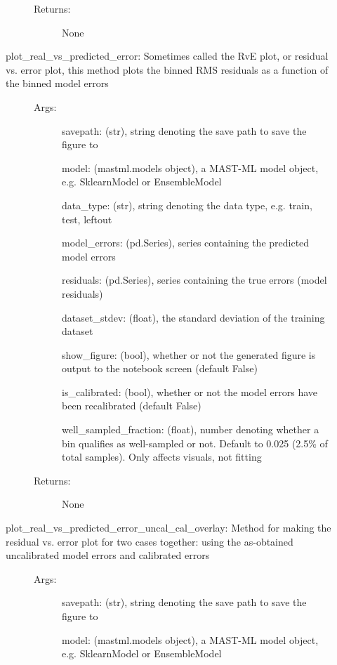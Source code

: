 \documentclass[letterpaper,10pt,english]{sphinxmanual}
\begin{document}
\begin{fulllineitems}
\begin{description}
\begin{description}
\begin{description}
\item[{Returns:}] \leavevmode
None

\end{description}

\item[{plot\_real\_vs\_predicted\_error: Sometimes called the RvE plot, or residual vs. error plot, this method plots the binned RMS residuals as a function of the binned model errors}] \leavevmode\begin{description}
\item[{Args:}] \leavevmode
savepath: (str), string denoting the save path to save the figure to

model: (mastml.models object), a MAST-ML model object, e.g. SklearnModel or EnsembleModel

data\_type: (str), string denoting the data type, e.g. train, test, leftout

model\_errors: (pd.Series), series containing the predicted model errors

residuals: (pd.Series), series containing the true errors (model residuals)

dataset\_stdev: (float), the standard deviation of the training dataset

show\_figure: (bool), whether or not the generated figure is output to the notebook screen (default False)

is\_calibrated: (bool), whether or not the model errors have been recalibrated (default False)

well\_sampled\_fraction: (float), number denoting whether a bin qualifies as well-sampled or not. Default to 0.025 (2.5\% of total samples). Only affects visuals, not fitting

\item[{Returns:}] \leavevmode
None

\end{description}

\item[{plot\_real\_vs\_predicted\_error\_uncal\_cal\_overlay: Method for making the residual vs. error plot for two cases together: using the as-obtained uncalibrated model errors and calibrated errors}] \leavevmode\begin{description}
\item[{Args:}] \leavevmode
savepath: (str), string denoting the save path to save the figure to

model: (mastml.models object), a MAST-ML model object, e.g. SklearnModel or EnsembleModel


\end{description}
\end{description}
\end{description}
\end{fulllineitems}
\end{document}
